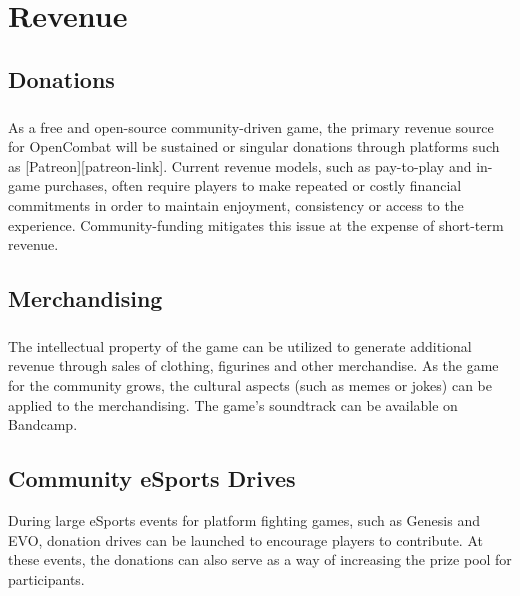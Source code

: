 \chapter{Revenue}

\section{Donations}

\paragraph{} As a free and open-source community-driven game, the primary revenue source for OpenCombat will be sustained or singular donations through platforms such as [Patreon][patreon-link]. Current revenue models, such as pay-to-play and in-game purchases, often require players to make repeated or costly financial commitments in order to maintain enjoyment, consistency or access to the experience. Community-funding mitigates this issue at the expense of short-term revenue.

\section{Merchandising}

\paragraph{} The intellectual property of the game can be utilized to generate additional revenue through sales of clothing, figurines and other merchandise. As the game for the community grows, the cultural aspects (such as memes or jokes) can be applied to the merchandising. The game's soundtrack can be available on Bandcamp.

\section{Community eSports Drives}

During large eSports events for platform fighting games, such as Genesis and EVO, donation drives can be launched to encourage players to contribute. At these events, the donations can also serve as a way of increasing the prize pool for participants.